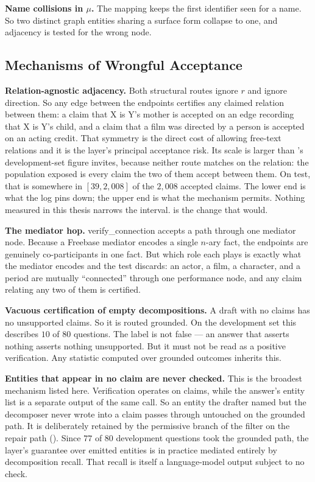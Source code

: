 \textbf{Name collisions in $\mu$.} The mapping keeps the first identifier seen
for a name. So two distinct graph entities sharing a surface form collapse to
one, and adjacency is tested for the wrong node.

\subsection*{Mechanisms of Wrongful Acceptance}

\textbf{Relation-agnostic adjacency.} Both structural routes ignore $r$ and
ignore direction. So any edge between the endpoints certifies any claimed
relation between them: a claim that X is Y's mother is accepted on an edge
recording that X is Y's child, and a claim that a film was directed by a person
is accepted on an acting credit. That symmetry is the direct cost of allowing
free-text relations and it is the layer's principal acceptance risk. Its scale
is larger than 's development-set figure invites,
because neither route matches on the relation: the population exposed is every
claim the two of them accept between them. On test, that is somewhere in $[39,
2{,}008]$ of the $2{,}008$ accepted claims. The lower end is what the log pins
down; the upper end is what the mechanism permits. Nothing measured in this
thesis narrows the interval.  is the change that
would.

\textbf{The mediator hop.} \textsf{verify\_connection} accepts a path through
one mediator node. Because a Freebase mediator encodes a single $n$-ary fact,
the endpoints are genuinely co-participants in one fact. But which role each
plays is exactly what the mediator encodes and the test discards: an actor, a
film, a character, and a period are mutually ``connected'' through one
performance node, and any claim relating any two of them is certified.

\textbf{Vacuous certification of empty decompositions.} A draft with no claims
has no unsupported claims. So it is routed \textsf{grounded}. On the development
set this describes $10$ of $80$ questions. The label is not false --- an answer
that asserts nothing asserts nothing unsupported. But it must not be read as
a positive verification. Any statistic computed over \textsf{grounded}
outcomes inherits this.

\textbf{Entities that appear in no claim are never checked.} This is the
broadest mechanism listed here. Verification operates on claims, while the
answer's entity list is a separate output of the same call. So an entity the
drafter named but the decomposer never wrote into a claim passes through
untouched on the grounded path. It is deliberately retained by the permissive
branch of the filter on the repair path (). Since
$77$ of $80$ development questions took the grounded path, the layer's guarantee
over emitted entities is in practice mediated entirely by decomposition recall.
That recall is itself a language-model output subject to no check.

